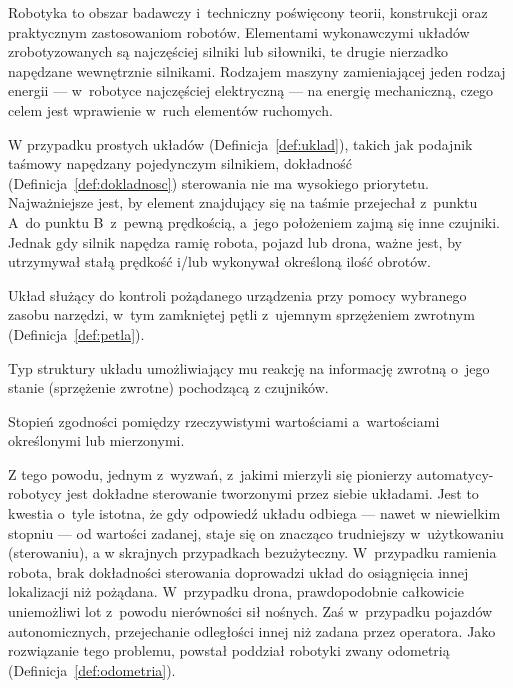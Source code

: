 \label{ch:wstep}

Robotyka to obszar badawczy i~techniczny poświęcony teorii, konstrukcji oraz praktycznym zastosowaniom robotów. Elementami wykonawczymi układów zrobotyzowanych są najczęściej silniki lub siłowniki, te drugie nierzadko napędzane wewnętrznie silnikami. Rodzajem maszyny zamieniającej jeden rodzaj energii --- w~robotyce najczęściej elektryczną --- na energię mechaniczną, czego celem jest wprawienie w~ruch elementów ruchomych.

W przypadku prostych układów (Definicja~\ref{def:uklad}), takich jak podajnik taśmowy napędzany pojedynczym silnikiem, dokładność (Definicja~\ref{def:dokladnosc}) sterowania nie ma wysokiego priorytetu. Najważniejsze jest, by element znajdujący się na taśmie przejechał z~punktu A~do punktu B~z~pewną prędkością, a~jego położeniem zajmą się inne czujniki. Jednak gdy silnik napędza ramię robota, pojazd lub drona, ważne jest, by utrzymywał stałą prędkość i/lub wykonywał określoną ilość obrotów.

\begin{Definition}\label{def:uklad}
   Układ służący do kontroli pożądanego urządzenia przy pomocy wybranego zasobu narzędzi, w~tym zamkniętej pętli z~ujemnym sprzężeniem zwrotnym (Definicja~\ref{def:petla}).
\end{Definition}

\begin{Definition}[Pętla]\label{def:petla}
    Typ struktury układu umożliwiający mu reakcję na informację zwrotną o~jego stanie (sprzężenie zwrotne) pochodzącą z czujników.
\end{Definition}

\begin{Definition}[Dokładność]\label{def:dokladnosc}
    Stopień zgodności pomiędzy rzeczywistymi wartościami a~wartościami określonymi lub mierzonymi.
\end{Definition}

Z tego powodu, jednym z~wyzwań, z~jakimi mierzyli się pionierzy automatycy-robotycy jest dokładne sterowanie tworzonymi przez siebie układami. Jest to kwestia o~tyle istotna, że gdy odpowiedź układu odbiega --- nawet w niewielkim stopniu --- od wartości zadanej, staje się on znacząco trudniejszy w~użytkowaniu (sterowaniu), a w skrajnych przypadkach bezużyteczny. W~przypadku ramienia robota, brak dokładności sterowania doprowadzi układ do osiągnięcia innej lokalizacji niż pożądana. W~przypadku drona, prawdopodobnie całkowicie uniemożliwi lot z~powodu nierówności sił nośnych. Zaś w~przypadku pojazdów autonomicznych, przejechanie odległości innej niż zadana przez operatora. Jako rozwiązanie tego problemu, powstał poddział robotyki zwany odometrią (Definicja~\ref{def:odometria}). 

